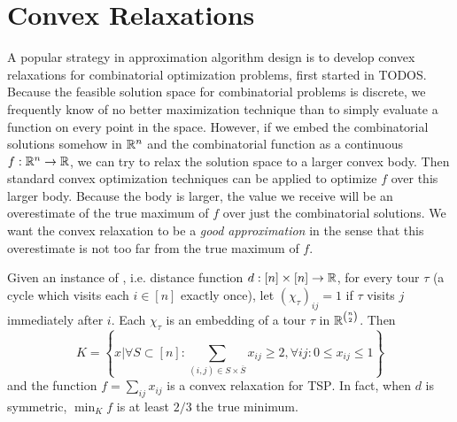 \section{Convex Relaxations}
A popular strategy in approximation algorithm design is to develop convex relaxations for combinatorial optimization problems, first started in TODOS\cite{}. 
Because the feasible solution space for combinatorial problems is discrete, we frequently know of no better maximization technique than to simply evaluate a function on every point in the space. However, if we embed the combinatorial solutions somehow in $\mathbb R^n$ and the combinatorial function as a continuous $f: \mathbb R^n \rightarrow \mathbb R$, we can try to relax the solution space to a larger convex body. Then standard convex optimization techniques \cite{} can be applied to optimize $f$ over this larger body. Because the body is larger, the value we receive will be an overestimate of the true maximum of $f$ over just the combinatorial solutions. We want the convex relaxation to be a \emph{good approximation} in the sense that this overestimate is not too far from the true maximum of $f$. 
\begin{example}
Given an instance of , i.e. distance function $d: [n] \times [n] \rightarrow \mathbb R$, for every tour $\tau$ (a cycle which visits each $i \in [n]$ exactly once), let $(\chi_\tau)_{ij} = 1$ if $\tau$ visits $j$ immediately after $i$. Each $\chi_\tau$ is an embedding of a tour $\tau$ in $\mathbb R^{\binom{n}{2}}$. Then 
\[K = \left\{x | \forall S \subset [n]: \sum_{(i,j) \in S \times \overline{S}} x_{ij} \geq 2, \forall ij: 0 \leq x_{ij} \leq 1\right\}\]
and the function $f = \sum_{ij} x_{ij}$ is a convex relaxation for \textsc{TSP}. In fact, when $d$ is symmetric, $\min_K f$ is at least $2/3$ the true minimum. 
\end{example}


